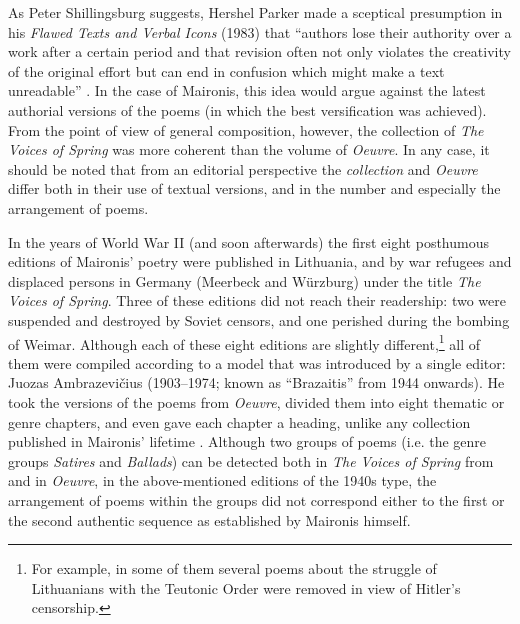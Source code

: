 \begin{paper}
As Peter Shillingsburg suggests, Hershel Parker made a
sceptical presumption in his \emph{Flawed Texts and Verbal Icons} (1983) that ``authors lose their authority over a work
after a certain period and that revision often not only violates the
creativity of the original effort but can end in confusion which might
make a text unreadable'' \citep[70]{shillingsburg_text_1991}. In the case of
Maironis, this idea would argue against the latest authorial versions
of the poems (in which the best versification was achieved). From the point of view
of  general composition, however, the collection of \emph{The Voices of
Spring} was more coherent than the volume of \emph{Oeuvre}. In any case,
it should be noted that from an editorial perspective the \emph{collection}
and \emph{Oeuvre} differ both in their use of textual versions, and in the
number and especially the arrangement of poems.

In the years of World War II (and soon
afterwards) the first eight posthumous editions of Maironis' poetry were published in Lithuania, and by war refugees and displaced persons in Germany (Meerbeck and Würzburg) under the title \emph{The Voices of Spring}. Three of these editions did not reach
their readership: two were suspended and destroyed by Soviet censors, and
one perished during the bombing of Weimar. Although each of these eight editions
are slightly different,\footnote{For example, in some of them several poems about the
struggle of Lithuanians with the Teutonic Order were removed in view of
Hitler's censorship.} all of them were compiled according to a model that was
introduced by a single editor: Juozas Ambrazevičius (1903--1974; known as ``Brazaitis'' from 1944 onwards). He took the versions of the poems from \emph{Oeuvre},
divided them into eight thematic or genre chapters, and even gave each chapter a
heading, unlike any collection published in Maironis' lifetime
\citep{maironis_pavasario_1942}. Although two groups of poems (i.e.  the genre groups
\emph{Satires} and \emph{Ballads}) can be detected both in \emph{The
Voices of Spring} from \citeyear{maironis_pavasario_1920} and in \emph{Oeuvre}, in the above-mentioned
editions of the 1940s type, the arrangement of poems within the groups
did not correspond either to the first or the second authentic sequence as
established by Maironis himself.


\end{paper}

